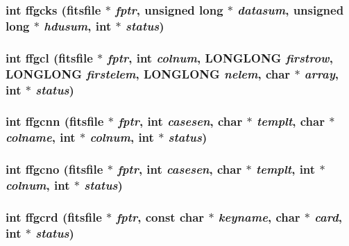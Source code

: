 \subsubsection{\setlength{\rightskip}{0pt plus 5cm}int ffgcks (\bf{fitsfile} $\ast$ {\em fptr}, unsigned long $\ast$ {\em datasum}, unsigned long $\ast$ {\em hdusum}, int $\ast$ {\em status})}\label{fitsio_8h_ac550539cbf9b960d2f9e4c8619a50d5}


\subsubsection{\setlength{\rightskip}{0pt plus 5cm}int ffgcl (\bf{fitsfile} $\ast$ {\em fptr}, int {\em colnum}, \bf{LONGLONG} {\em firstrow}, \bf{LONGLONG} {\em firstelem}, \bf{LONGLONG} {\em nelem}, char $\ast$ {\em array}, int $\ast$ {\em status})}\label{fitsio_8h_d208fea0ab2ac53456307cdc890b07ca}


\subsubsection{\setlength{\rightskip}{0pt plus 5cm}int ffgcnn (\bf{fitsfile} $\ast$ {\em fptr}, int {\em casesen}, char $\ast$ {\em templt}, char $\ast$ {\em colname}, int $\ast$ {\em colnum}, int $\ast$ {\em status})}\label{fitsio_8h_64f9be429b2bc87b2c632dc87da8c647}


\subsubsection{\setlength{\rightskip}{0pt plus 5cm}int ffgcno (\bf{fitsfile} $\ast$ {\em fptr}, int {\em casesen}, char $\ast$ {\em templt}, int $\ast$ {\em colnum}, int $\ast$ {\em status})}\label{fitsio_8h_b16df66331ffdbe091b4bf638c2fb3fb}


\subsubsection{\setlength{\rightskip}{0pt plus 5cm}int ffgcrd (\bf{fitsfile} $\ast$ {\em fptr}, const char $\ast$ {\em keyname}, char $\ast$ {\em card}, int $\ast$ {\em status})}\label{fitsio_8h_d5ea06a34fb3164788ecf166058654fc}


